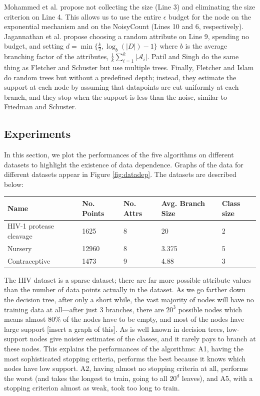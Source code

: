 \documentclass[11pt]{article}
\begin{document}
Mohammed et al. \cite{Mohammed:2015} propose not collecting the size (Line 3) and eliminating the size criterion on Line 4. This allows us to use the entire $\epsilon$ budget for the node on the exponential mechanism and on the NoisyCount (Lines 10 and 6, respectively). Jagannathan et al. \cite{Jagannathan:2009} propose choosing a random attribute on Line 9, spending no budget, and setting $d = \min\{\frac{k}{2}, \log_b(|D|)-1\}$ where $b$ is the average branching factor of the attributes, $\frac{1}{k}\sum_{i=1}^k |\mathcal{A}_i|$. Patil and Singh \cite{Singh:2014} do the same thing as Fletcher and Schuster but use multiple trees. Finally, Fletcher and Islam \cite{Fletcher:2015} do random trees but without a predefined depth; instead, they estimate the support at each node by assuming that datapoints are cut uniformly at each branch, and they stop when the support is less than the noise, similar to Friedman and Schuster.

\subsection{Experiments}
In this section, we plot the performances of the five algorithms on different datasets to highlight the existence of data dependence. Graphs of the data for different datasets appear in Figure \ref{fig:datadep}. The datasets are described below:
\begin{tabular}{|p{3cm}|l|l|l|l|}
\hline
Name & No. Points & No. Attrs & Avg. Branch Size & Class size \\ \hline
HIV-1 protease cleavage & 1625 & 8 & 20 & 2 \\ \hline
Nursery & 12960 & 8 & 3.375 & 5 \\ \hline
Contraceptive & 1473 & 9 & 4.88 & 3 \\ \hline
\end{tabular}
The HIV dataset is a sparse dataset; there are far more possible attribute values than the number of data points actually in the dataset. As we go farther down the decision tree, after only a short while, the vast majority of nodes will have no training data at all---after just 3 branches, there are $20^3$ possible nodes which means almost $80\%$ of the nodes have to be empty, and most of the nodes have large support [insert a graph of this]. As is well known in decision trees, low-support nodes give noisier estimates of the classes, and it rarely pays to branch at these nodes. This explains the performances of the algorithms: A1, having the most sophisticated stopping criteria, performs the best because it knows which nodes have low support. A2, having almost no stopping criteria at all, performs the worst (and takes the longest to train, going to all $20^d$ leaves), and A5, with a stopping criterion almost as weak, took too long to train.
\end{document}
